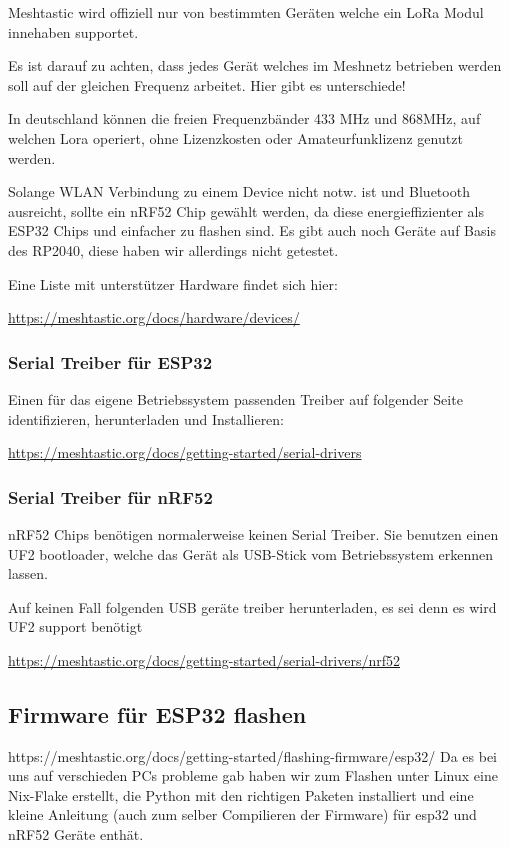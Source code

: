 \documentclass[12pt,a4paper]{article}
\begin{document}
Meshtastic wird offiziell nur von bestimmten Geräten welche ein LoRa Modul innehaben supportet.

Es ist darauf zu achten, dass jedes Gerät welches im Meshnetz betrieben werden soll auf der gleichen Frequenz arbeitet. Hier gibt es unterschiede!

In deutschland können die freien Frequenzbänder 433 MHz und 868MHz, auf welchen Lora operiert, ohne Lizenzkosten oder Amateurfunklizenz genutzt werden.

Solange WLAN Verbindung zu einem Device nicht notw. ist und Bluetooth ausreicht, sollte ein nRF52 Chip gewählt werden, da diese energieffizienter als ESP32 Chips und einfacher zu flashen sind. Es gibt auch noch Geräte auf Basis des RP2040, diese haben wir allerdings nicht getestet.

Eine Liste mit unterstützer Hardware findet sich hier:

\url{https://meshtastic.org/docs/hardware/devices/}

\subsubsection{Serial Treiber für ESP32}
Einen für das eigene Betriebssystem passenden Treiber auf folgender Seite identifizieren, herunterladen und Installieren:

\url{https://meshtastic.org/docs/getting-started/serial-drivers}

\subsubsection{Serial Treiber für nRF52}
nRF52 Chips benötigen normalerweise keinen Serial Treiber. Sie benutzen einen UF2 bootloader, welche das Gerät als USB-Stick vom Betriebssystem erkennen lassen.

Auf keinen Fall folgenden USB geräte treiber herunterladen, es sei denn es wird UF2 support benötigt

\url{https://meshtastic.org/docs/getting-started/serial-drivers/nrf52}

\subsection{Firmware für ESP32 flashen}
https://meshtastic.org/docs/getting-started/flashing-firmware/esp32/ Da es bei uns auf verschieden PCs probleme gab haben wir zum Flashen unter Linux eine Nix-Flake erstellt, die Python mit den richtigen Paketen installiert und eine kleine Anleitung (auch zum selber Compilieren der Firmware) für esp32 und nRF52 Geräte enthät.
\end{document}
